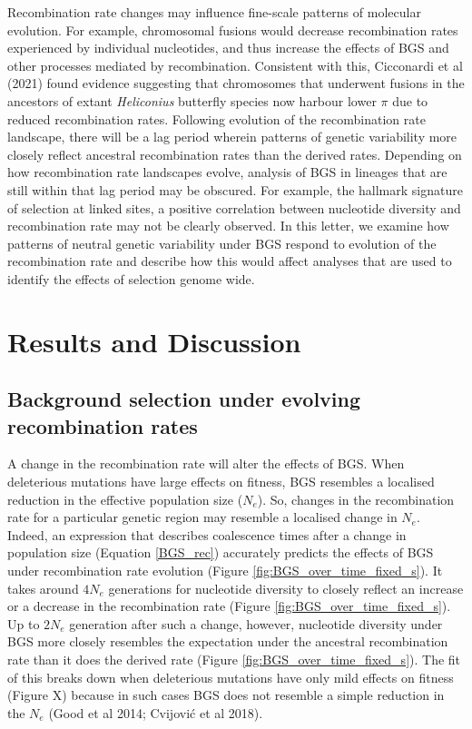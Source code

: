 \documentclass[10pt,twoside, twocolumn]{GSA_format}
\begin{document}
\vspace{5px}

Recombination rate changes may influence fine-scale patterns of molecular evolution. For example, chromosomal fusions would decrease recombination rates experienced by individual nucleotides, and thus increase the effects of BGS and other processes mediated by recombination. Consistent with this, Cicconardi et al (2021) found evidence suggesting that chromosomes that underwent fusions in the ancestors of extant \textit{Heliconius} butterfly species now harbour lower $\pi$ due to reduced recombination rates. Following evolution of the recombination rate landscape, there will be a lag period wherein patterns of genetic variability more closely reflect ancestral recombination rates than the derived rates. Depending on how recombination rate landscapes evolve, analysis of BGS in lineages that are still within that lag period may be obscured. For example, the hallmark signature of selection at linked sites, a positive correlation between nucleotide diversity and recombination rate may not be clearly observed. In this letter, we examine how patterns of neutral genetic variability under BGS respond to evolution of the recombination rate and describe how this would affect analyses that are used to identify the effects of selection genome wide. 

\section{Results and Discussion}

\subsection{Background selection under evolving recombination rates}

A change in the recombination rate will alter the effects of BGS. When deleterious mutations have large effects on fitness, BGS resembles a localised reduction in the effective population size ($N_e$). So, changes in the recombination rate for a particular genetic region may resemble a localised change in $N_e$. Indeed, an expression that describes coalescence times after a change in population size (Equation \ref{BGS_rec}) accurately predicts the effects of BGS under recombination rate evolution (Figure \ref{fig:BGS_over_time_fixed_s}). It takes around $4N_e$ generations for nucleotide diversity to closely reflect an increase or a decrease in the recombination rate (Figure \ref{fig:BGS_over_time_fixed_s}). Up to $2N_e$ generation after such a change, however, nucleotide diversity under BGS more closely resembles the expectation under the ancestral recombination rate than it does the derived rate (Figure \ref{fig:BGS_over_time_fixed_s}). The fit of this breaks down when deleterious mutations have only mild effects on fitness (Figure X) because in such cases BGS does not resemble a simple reduction in the $N_e$ (Good et al 2014; Cvijović et al 2018).  
\end{document}
